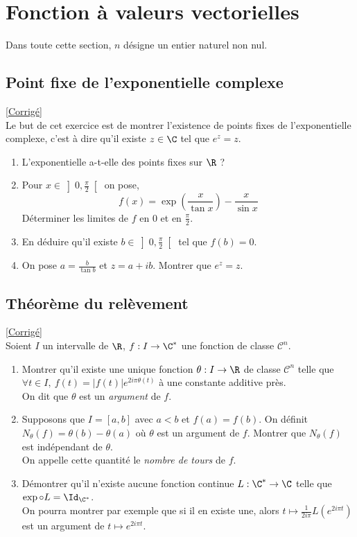 \documentclass{book}
\begin{document}
\chapter{Fonction à valeurs vectorielles}
Dans toute cette section, $n$ désigne un entier naturel non nul.\\

\section{Point fixe de l'exponentielle complexe}
\textcolor{blue}{\hyperref[sec:point-fixe-de-lexponentielle-complexe]{[Corrigé]}}\\
\label{Point fixe de l'exponentielle complexe}
Le but de cet exercice est de montrer l'existence de points fixes de l'exponentielle complexe, c'est à dire qu'il existe $z\in \C$ tel que $e^z=z$.
\begin{enumerate}
	\item L'exponentielle a-t-elle des points fixes sur $\R$ ?
	\item Pour $x\in \displaystyle\left]0,\frac{\pi}{2}\right[$ on pose, $$f(x)=\exp\left(\frac{x}{\tan x}\right)-\frac{x}{\sin x}$$
	Déterminer les limites de $f$ en $0$ et en $\displaystyle\frac{\pi}{2}$.
	\item En déduire qu'il existe $b\in \displaystyle\left]0,\frac{\pi}{2}\right[$ tel que $f(b)=0$.
	\item On pose $a=\displaystyle\frac{b}{\tan b}$ et $z=a+ib$. Montrer que $e^z=z$.
\end{enumerate}

\section{Théorème du relèvement}
\textcolor{blue}{\hyperref[sec:theoreme-du-relevement]{[Corrigé]}}\\
\label{Théorème du relèvement}
Soient $I$ un intervalle de $\R$, $f:I\to \C^*$ une fonction de classe $\mathcal C^n$. 
\begin{enumerate}
	\item Montrer qu'il existe une unique fonction $\theta:I\to \R$ de classe $\mathcal C^n$ telle que $\forall t\in I,\ f(t)=|f(t)|e^{2i\pi\theta(t)}$ à une constante additive près.\\
	On dit que $\theta$ est un \textit{argument} de $f$.
	\item Supposons que $I=[a,b]$ avec $a<b$ et $f(a)=f(b)$. On définit $N_\theta(f)=\theta(b)-\theta(a)$ où $\theta$ est un argument de $f$. Montrer que $N_\theta(f)$ est indépendant de $\theta$.\\
	On appelle cette quantité le \textit{nombre de tours} de $f$.
	\item Démontrer qu'il n'existe aucune fonction continue $L:\C^*\to \C$ telle que $\exp\circ L=\Id_{\C^*}$.\\
	On pourra montrer par exemple que si il en existe une, alors $t\mapsto\displaystyle\frac{1}{2i\pi}L(e^{2i\pi t})$ est un argument de $t\mapsto e^{2i\pi t}$.
\end{enumerate}
\end{document}
